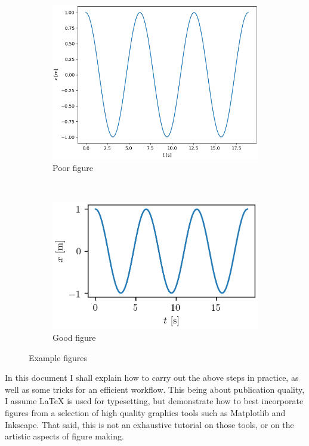 \documentclass[a4paper,twocolumn]{article}
\begin{document}
\begin{figure}
    \begin{subfigure}{\linewidth}
        \includegraphics[width=\columnwidth]{poorfig.png}
        \caption{Poor figure}
        \label{fig:poorfig}
    \end{subfigure}
    ~\\

    \begin{subfigure}{\linewidth}
        \includegraphics{goodfig.png}
        \caption{Good figure}
        \label{fig:goodfig}
    \end{subfigure}
    \caption{Example figures}
\end{figure}

In this document I shall explain how to carry out the above steps in practice, as well as some tricks for an efficient workflow.
This being about publication quality, I assume \LaTeX{} is used for typesetting, but demonstrate how to best incorporate figures from a selection of high quality graphics tools such as Matplotlib and Inkscape.
That said, this is not an exhaustive tutorial on those tools, or on the artistic aspects of figure making.
\end{document}
